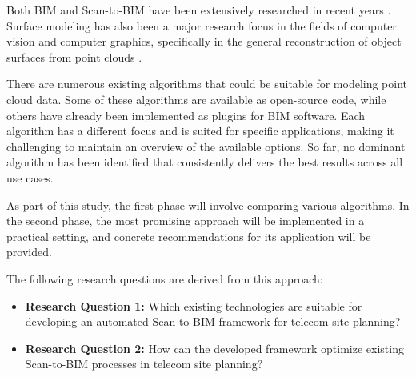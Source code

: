 \begin{English}
    Both BIM and Scan-to-BIM have been extensively researched in recent years \cite{rochaSurveyScantoBIMPractices2021}.
    Surface modeling has also been a major research focus in the fields of computer vision and computer graphics, specifically in the general reconstruction of object surfaces from point clouds \cite{nanPolyFitPolygonalSurface2017}.

    There are numerous existing algorithms that could be suitable for modeling point cloud data. Some of these algorithms are available as open-source code, while others have already been implemented as plugins for BIM software. Each algorithm has a different focus and is suited for specific applications, making it challenging to maintain an overview of the available options. So far, no dominant algorithm has been identified that consistently delivers the best results across all use cases.

    As part of this study, the first phase will involve comparing various algorithms. In the second phase, the most promising approach will be implemented in a practical setting, and concrete recommendations for its application will be provided.

    The following research questions are derived from this approach:

    \begin{itemize}
        \item \textbf{Research Question 1:} Which existing technologies are suitable for developing an automated Scan-to-BIM framework for telecom site planning?
        \item \textbf{Research Question 2:} How can the developed framework optimize existing Scan-to-BIM processes in telecom site planning?
    \end{itemize}
\end{English}

